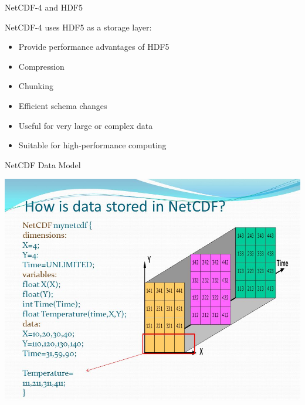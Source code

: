 \documentclass[compress,11pt,xcolor=svgnames,aspectratio=169]{beamer}
\begin{document}
\begin{frame}[t]{NetCDF-4 and HDF5}

NetCDF-4 uses HDF5 as a storage layer:

\begin{itemize}
\setlength\itemsep{0.4cm}

    \item Provide performance advantages of HDF5
    \item Compression
    \item Chunking
    \item Efficient schema changes
    \item Useful for very large or complex data
    \item Suitable for high-performance computing

\end{itemize}

\end{frame}

\begin{frame}[t]{NetCDF Data Model}

\begin{center}
\includegraphics[scale=0.4]{fig/netcdf-data}
\end{center}

\end{frame}
\end{document}
